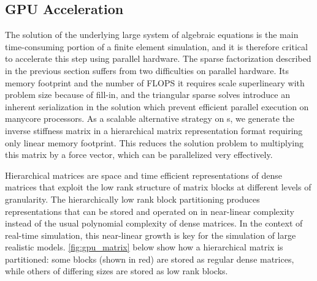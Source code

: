 %



\subsection{GPU Acceleration}\label{ssec:gpu_acceleration}

The solution of the underlying large system of algebraic equations is the main time-consuming portion of a finite element simulation, and it is therefore critical to accelerate this step using  parallel hardware. The sparse factorization described in the previous section suffers from two difficulties on parallel  hardware. Its memory footprint and the number of FLOPS it requires scale superlineary with problem size because of fill-in, and the triangular sparse solves introduce an inherent serialization in the solution which prevent efficient parallel execution on manycore processors. As a scalable alternative strategy on s, we generate the inverse stiffness matrix in a hierarchical matrix representation format requiring only linear memory footprint.  This reduces the solution problem to multiplying this matrix by a force vector, which can be parallelized very effectively.

Hierarchical matrices are space and time efficient representations of dense matrices that exploit the low rank structure of matrix blocks at different levels of granularity. The hierarchically low rank block partitioning produces representations that can be stored and operated on in near-linear complexity instead of the usual polynomial complexity of dense matrices. In the context of real-time simulation, this near-linear growth is key for the simulation of large realistic models. \autoref{fig:gpu_matrix} below show how a hierarchical matrix is partitioned: some blocks (shown in red) are stored as regular dense matrices, while others of differing sizes are stored as low rank blocks.

